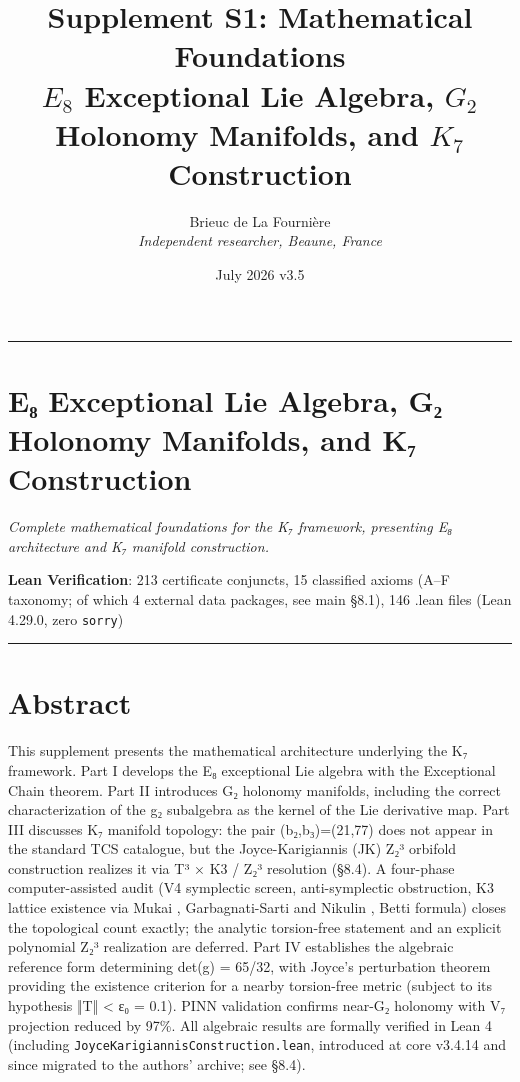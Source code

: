 \documentclass[11pt,a4paper]{article}
\title{%
\LARGE\textbf{Supplement S1: Mathematical Foundations}\\[0.3em]
\large $E_8$ Exceptional Lie Algebra, $G_2$ Holonomy Manifolds, and $K_7$ Construction%
}
\author{Brieuc de La Fourni\`ere \\ \textit{Independent researcher, Beaune, France}}
\date{July 2026 \quad\textbar\quad v3.5}
\begin{document}
\maketitle
\noindent\rule{\textwidth}{0.2pt}

\thispagestyle{fancy}

\section{E₈ Exceptional Lie Algebra, G₂ Holonomy Manifolds, and K₇ Construction}\label{eux2088-exceptional-lie-algebra-gux2082-holonomy-manifolds-and-kux2087-construction}

\emph{Complete mathematical foundations for the K₇ framework, presenting E₈ architecture and K₇ manifold construction.}

\textbf{Lean Verification}: 213 certificate conjuncts, 15 classified axioms (A--F taxonomy; of which 4 external data packages, see main §8.1), 146 .lean files (Lean 4.29.0, zero \texttt{sorry})

\begin{center}\rule{\linewidth}{0.5pt}\end{center}

\section{Abstract}\label{abstract}

This supplement presents the mathematical architecture underlying the K₇ framework. Part I develops the E₈ exceptional Lie algebra with the Exceptional Chain theorem. Part II introduces G₂ holonomy manifolds, including the correct characterization of the g₂ subalgebra as the kernel of the Lie derivative map. Part III discusses K₇ manifold topology: the pair (b₂,b₃)=(21,77) does not appear in the standard TCS catalogue, but the Joyce-Karigiannis (JK) Z₂³ orbifold construction realizes it via T³ × K3 / Z₂³ resolution (§8.4). A four-phase computer-assisted audit (V4 symplectic screen, anti-symplectic obstruction, K3 lattice existence via Mukai \cite{44}, Garbagnati-Sarti \cite{45} and Nikulin \cite{51}, Betti formula) closes the topological count exactly; the analytic torsion-free statement and an explicit polynomial Z₂³ realization are deferred. Part IV establishes the algebraic reference form determining det(g) = 65/32, with Joyce's perturbation theorem providing the existence criterion for a nearby torsion-free metric (subject to its hypothesis ‖T‖ \textless{} ε₀ = 0.1). PINN validation confirms near-G₂ holonomy with V₇ projection reduced by 97\%. All algebraic results are formally verified in Lean 4 (including \texttt{Joyce\allowbreak{}Karigiannis\allowbreak{}Construction.\allowbreak{}lean}, introduced at core v3.4.14 and since migrated to the authors' archive; see §8.4).
\end{document}
